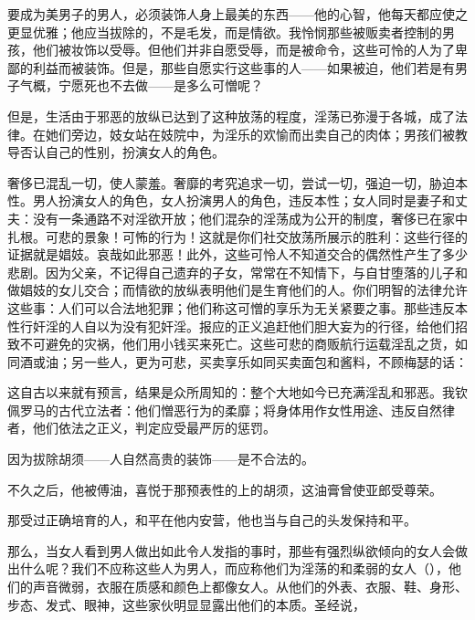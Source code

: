 要成为美男子的男人，必须装饰人身上最美的东西——他的心智，他每天都应使之更显优雅；他应当拔除的，不是毛发，而是情欲。我怜悯那些被贩卖者控制的男孩，他们被妆饰以受辱。但他们并非自愿受辱，而是被命令，这些可怜的人为了卑鄙的利益而被装饰。但是，那些自愿实行这些事的人——如果被迫，他们若是有男子气概，宁愿死也不去做——是多么可憎呢？\par

但是，生活由于邪恶的放纵已达到了这种放荡的程度，淫荡已弥漫于各城，成了法律。在她们旁边，妓女站在妓院中，为淫乐的欢愉而出卖自己的肉体；男孩们被教导否认自己的性别，扮演女人的角色。\par

奢侈已混乱一切，使人蒙羞。奢靡的考究追求一切，尝试一切，强迫一切，胁迫本性。男人扮演女人的角色，女人扮演男人的角色，违反本性；女人同时是妻子和丈夫：没有一条通路不对淫欲开放；他们混杂的淫荡成为公开的制度，奢侈已在家中扎根。可悲的景象！可怖的行为！这就是你们社交放荡所展示的胜利：这些行径的证据就是娼妓。哀哉如此邪恶！此外，这些可怜人不知道交合的偶然性产生了多少悲剧。因为父亲，不记得自己遗弃的子女，常常在不知情下，与自甘堕落的儿子和做娼妓的女儿交合；而情欲的放纵表明他们是生育他们的人。你们明智的法律允许这些事：人们可以合法地犯罪；他们称这可憎的享乐为无关紧要之事。那些违反本性行奸淫的人自以为没有犯奸淫。报应的正义追赶他们胆大妄为的行径，给他们招致不可避免的灾祸，他们用小钱买来死亡。这些可悲的商贩航行运载淫乱之货，如同酒或油；另一些人，更为可悲，买卖享乐如同买卖面包和酱料，不顾梅瑟的话：\par

这自古以来就有预言，结果是众所周知的：整个大地如今已充满淫乱和邪恶。我钦佩罗马的古代立法者：他们憎恶行为的柔靡；将身体用作女性用途、违反自然律者，他们依法之正义，判定应受最严厉的惩罚。\par

因为拔除胡须——人自然高贵的装饰——是不合法的。\par

\par

不久之后，他被傅油，喜悦于那预表性的上的胡须，这油膏曾使亚郎受尊荣。\par

那受过正确培育的人，和平在他内安营，他也当与自己的头发保持和平。\par

那么，当女人看到男人做出如此令人发指的事时，那些有强烈纵欲倾向的女人会做出什么呢？我们不应称这些人为男人，而应称他们为淫荡的和柔弱的女人（），他们的声音微弱，衣服在质感和颜色上都像女人。从他们的外表、衣服、鞋、身形、步态、发式、眼神，这些家伙明显显露出他们的本质。圣经说，\par

